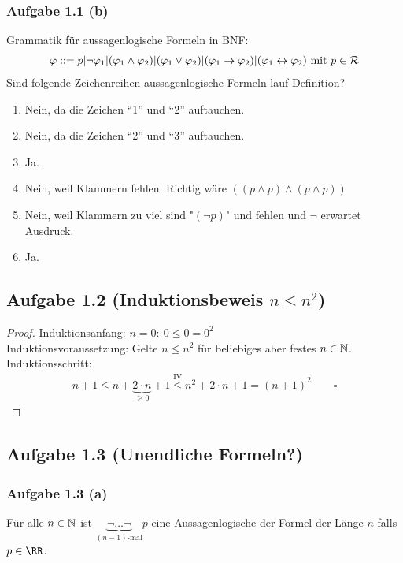 \subsubsection{Aufgabe 1.1 (b)}
Grammatik für aussagenlogische Formeln in BNF:
\begin{align*}
	\varphi::=p|\neg \varphi_1|(\varphi_1\wedge\varphi_2)|(\varphi_1\vee\varphi_2)|(\varphi_1\to\varphi_2)|(\varphi_1\leftrightarrow\varphi_2)\mit p\in\mathcal{R}
\end{align*}
Sind folgende Zeichenreihen aussagenlogische Formeln lauf Definition?
\begin{enumerate}[label=(\arabic*)]
	\item Nein, da die Zeichen ``1'' und ``2'' auftauchen.
	\item Nein, da die Zeichen ``2'' und ``3'' auftauchen.
	\item Ja.
	\item Nein, weil Klammern fehlen. Richtig wäre $((p\wedge p)\wedge(p\wedge p))$
	\item Nein, weil Klammern zu viel sind "$(\neg p)$" und fehlen und $\neg$ erwartet Ausdruck.
	\item Ja.
\end{enumerate}

\subsection{Aufgabe 1.2 (Induktionsbeweis \texorpdfstring{$n\leq n^2$}{n<=n²})}

\begin{proof}
	Induktionsanfang: $n=0:~0\leq0=0^2$\\
	Induktionsvoraussetzung: Gelte $n\leq n^2$ für beliebiges aber festes $n\in\N$.\\
	Induktionsschritt: 
	\begin{align*}
		n+1\leq
		n+\underbrace{2\cdot n}_{\geq0}+1
		\overset{\text{IV}}{\leq} n^2+2\cdot n+1=(n+1)^2\qquad\square
	\end{align*}
\end{proof}

\subsection{Aufgabe 1.3 (Unendliche Formeln?)}

\subsubsection{Aufgabe 1.3 (a)}
 Für alle $n\in\N$ ist $\underbrace{\neg\ldots\neg}_{(n-1)\text{-mal}}p$ eine Aussagenlogische der Formel der Länge $n$ falls $p\in\RR$.


